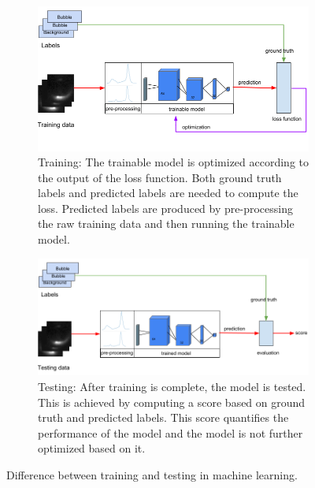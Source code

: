 		\begin{figure}
			\centering
			\begin{subfigure}[b]{\textwidth}
				\centering
				\includegraphics[scale=.6]{images/training_intro.png}
				\caption{Training: The trainable model is optimized according to the output of the loss function. Both ground truth labels and predicted labels are needed to compute the loss. Predicted labels are produced by pre-processing the raw training data and then running the trainable model. }
			\end{subfigure}
			\vfill
			\begin{subfigure}[b]{\textwidth}
				\centering
				\includegraphics[scale=.6]{images/testing_intro.png}
				\caption{Testing: After training is complete, the model is tested. This is achieved by computing a score based on ground truth and predicted labels. This score quantifies the performance of the model and the model is not further optimized based on it.}
			\end{subfigure}
			\caption{Difference between training and testing in machine learning.}
			\label{fig:machine_learning_intro}
		\end{figure}				
		
		
